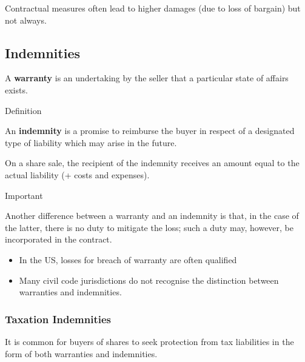 \documentclass[
]{article}
\providecommand{\tightlist}{%
  \setlength{\itemsep}{0pt}\setlength{\parskip}{0pt}}
\newenvironment{env-3a4a363c-8d41-4783-bfde-af85d2b9ad5f}
{
    \savenotes\tcolorbox[blanker,breakable,left=5pt,borderline west={2pt}{-4pt}{gold}]
}
{
    \endtcolorbox\spewnotes
}
\newenvironment{env-8890de02-1ba1-42c2-9b89-cb105d97c320}
{
    \savenotes\tcolorbox[blanker,breakable,left=5pt,borderline west={2pt}{-4pt}{cyan}]
}
{
    \endtcolorbox\spewnotes
}
\begin{document}
Contractual measures often lead to higher damages (due to loss of
bargain) but not always.

\hypertarget{indemnities}{%
\subsection{Indemnities}\label{indemnities}}

A \textbf{warranty} is an undertaking by the seller that a particular
state of affairs exists.

\begin{env-3a4a363c-8d41-4783-bfde-af85d2b9ad5f}

Definition

An \textbf{indemnity} is a promise to reimburse the buyer in respect of
a designated type of liability which may arise in the future.

\end{env-3a4a363c-8d41-4783-bfde-af85d2b9ad5f}

On a share sale, the recipient of the indemnity receives an amount equal
to the actual liability (+ costs and expenses).

\begin{env-8890de02-1ba1-42c2-9b89-cb105d97c320}

Important

Another difference between a warranty and an indemnity is that, in the
case of the latter, there is no duty to mitigate the loss; such a duty
may, however, be incorporated in the contract.

\end{env-8890de02-1ba1-42c2-9b89-cb105d97c320}

\begin{itemize}
\tightlist
\item
  In the US, losses for breach of warranty are often qualified
\item
  Many civil code jurisdictions do not recognise the distinction between
  warranties and indemnities.
\end{itemize}

\hypertarget{taxation-indemnities}{%
\subsubsection{Taxation Indemnities}\label{taxation-indemnities}}

It is common for buyers of shares to seek protection from tax
liabilities in the form of both warranties and indemnities.
\end{document}
